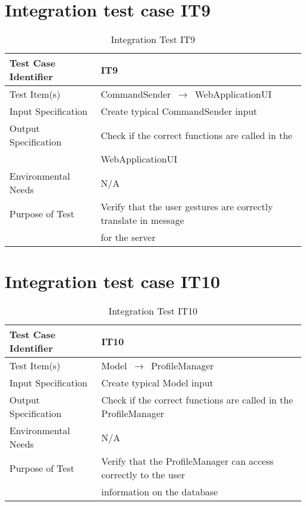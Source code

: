 \documentclass[../../testPlan.tex]{subfiles}
\begin{document}
	\section{Integration test case IT9}
		\begin{table}[H]
			\centering
			\label{IT9}
			\begin{tabular}{ll}
				\hline
				Test Case Identifier & IT9  \\ \hline
				Test Item(s)         & CommandSender $\,\to\,$ WebApplicationUI\\ \hline
				Input Specification  & Create typical CommandSender input  \\ \hline
				Output Specification & Check if the correct functions are called in the \\ & WebApplicationUI\\ \hline
				Environmental Needs  &  N/A \\ \hline
				Purpose of Test      &  Verify that the user gestures are correctly translate in message \\ & for the server  \\ \hline
			\end{tabular}
			\caption{Integration Test IT9}
		\end{table}
		
		
	\section{Integration test case IT10}
		\begin{table}[H]
			\centering
			\label{IT10}
			\begin{tabular}{ll}
				\hline
				Test Case Identifier & IT10  \\ \hline
				Test Item(s)         & Model $\,\to\,$ ProfileManager\\ \hline
				Input Specification  & Create typical Model input  \\ \hline
				Output Specification & Check if the correct functions are called in the ProfileManager\\ \hline
				Environmental Needs  &  N/A \\ \hline
				Purpose of Test      &  Verify that the ProfileManager can access correctly to the user \\ & information on the database \\ \hline
			\end{tabular}
			\caption{Integration Test IT10}
		\end{table}
		
\end{document}
